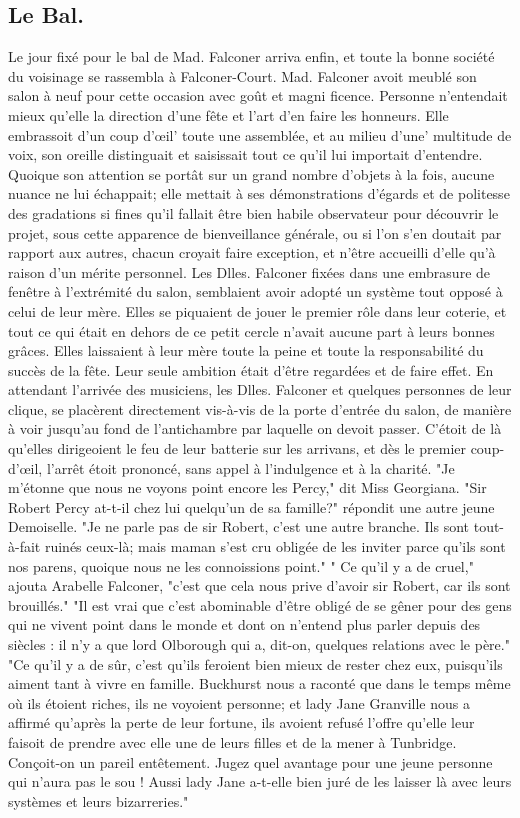 \subsection{Le Bal.}
Le jour fixé pour le bal de Mad. Falconer arriva enfin, et toute la bonne société du voisinage se rassembla à Falconer-Court. Mad. Falconer avoit meublé son salon à neuf pour cette occasion avec goût et magni\setcounter{page}{126} ficence. Personne n'entendait mieux qu'elle la direction d'une fête et l'art d'en faire les honneurs. Elle embrassoit d'un coup d'œil' toute une assemblée, et au milieu d'une' multitude de voix, son oreille distinguait et saisissait tout ce qu'il lui importait d'entendre. Quoique son attention se portât sur un grand nombre d'objets à la fois, aucune nuance ne lui échappait; elle mettait à ses démonstrations d'égards et de politesse des gradations si fines qu'il fallait être bien habile observateur pour découvrir le projet, sous cette apparence de bienveillance générale, ou si l'on s'en doutait par rapport aux autres, chacun croyait faire exception, et n'être accueilli d'elle qu'à raison d'un mérite personnel.
Les Dlles. Falconer fixées dans une embrasure de fenêtre à l'extrémité du salon, semblaient avoir adopté un système tout opposé à celui de leur mère. Elles se piquaient de jouer le premier rôle dans leur coterie, et tout ce qui était en dehors de ce petit cercle n'avait aucune part à leurs bonnes grâces. Elles laissaient à leur mère toute la peine et toute la responsabilité du succès de la fête. Leur seule ambition était d'être regardées et de faire effet.\setcounter{page}{127} En attendant l'arrivée des musiciens, les Dlles. Falconer et quelques personnes de leur clique, se placèrent directement vis-à-vis de la porte d'entrée du salon, de manière à voir jusqu'au fond de l'antichambre par laquelle on devoit passer. C'étoit de là qu'elles dirigeoient le feu de leur batterie sur les arrivans, et dès le premier coup-d'œil, l'arrêt étoit prononcé, sans appel à l'indulgence et à la charité.
"Je m'étonne que nous ne voyons point encore les Percy," dit Miss Georgiana.
"Sir Robert Percy at-t-il chez lui quelqu'un de sa famille?" répondit une autre jeune Demoiselle.
"Je ne parle pas de sir Robert, c'est une autre branche. Ils sont tout-à-fait ruinés ceux-là; mais maman s'est cru obligée de les inviter parce qu'ils sont nos parens, quoique nous ne les connoissions point."
" Ce qu'il y a de cruel," ajouta Arabelle Falconer, "c'est que cela nous prive d'avoir sir Robert, car ils sont brouillés."
"Il est vrai que c'est abominable d'être obligé de se gêner pour des gens qui ne vivent point dans le monde et dont on n'entend plus parler depuis des siècles : il n'y a que lord Olborough qui a, dit-on, quelques relations avec le père."\setcounter{page}{128} "Ce qu'il y a de sûr, c'est qu'ils feroient bien mieux de rester chez eux, puisqu'ils aiment tant à vivre en famille. Buckhurst nous a raconté que dans le temps même où ils étoient riches, ils ne voyoient personne; et lady Jane Granville nous a affirmé qu'après la perte de leur fortune, ils avoient refusé l'offre qu'elle leur faisoit de prendre avec elle une de leurs filles et de la mener à Tunbridge. Conçoit-on un pareil entêtement. Jugez quel avantage pour une jeune personne qui n'aura pas le sou ! Aussi lady Jane a-t-elle bien juré de les laisser là avec leurs systèmes et leurs bizarreries."
